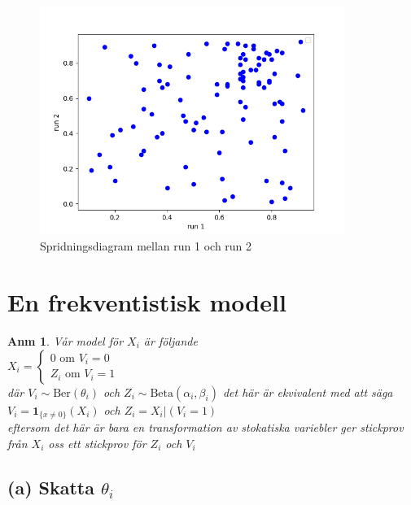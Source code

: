 \documentclass{assignment}
\newcommand{\indicator}[1]{\mathbf{1}_{\{#1\}}}
\newtheorem{anm}{Anm}
\begin{document}
\begin{figure}[!h]
    \caption{Spridningsdiagram mellan run 1 och run 2}
    \begin{center}
        \includegraphics[width = 99mm]{assets/Figure_1.png}
    \end{center}
    \label{Spridningsdiagram}
\end{figure}

\newpage
\section{En frekventistisk modell}
\begin{anm} \label{properties}
    Vår model för $X_i$ är följande 
    \\ $X_i = \left\{\begin{matrix}
        0 \text{ om } V_i=0
        \\ Z_i \text{ om } V_i=1
    \end{matrix}\right.$
    \\ där $V_i \sim \text{Ber}(\theta_i)$ och $Z_i\sim \text{Beta}(\alpha_i,\beta_i)$ det här är ekvivalent med att säga
    \\ $V_i = \indicator{x\neq0}(X_i)$ och $Z_i= X_i|(V_i=1)$ 
    \\ eftersom det här är bara en transformation av stokatiska variebler ger stickprov från $X_i$ oss ett stickprov för $Z_i$ och $V_i$
\end{anm}

\subsection*{(a) Skatta $\theta_{i}$}
\end{document}
